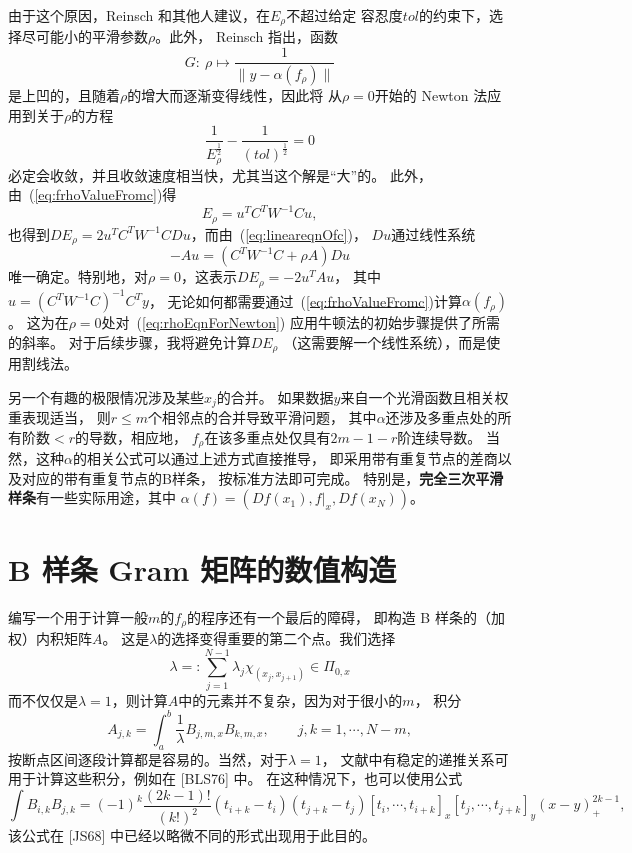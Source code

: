 由于这个原因，Reinsch 和其他人建议，在$E_{\rho}$不超过给定
容忍度$tol$的约束下，选择尽可能小的平滑参数$\rho$。此外，
Reinsch 指出，函数
\begin{displaymath}
  G:\ \rho\mapsto \frac{1}{\|y-\alpha(f_{\rho})\|}
\end{displaymath}
是上凹的，且随着$\rho$的增大而逐渐变得线性，因此将
从$\rho=0$开始的 Newton 法应用到关于$\rho$的方程
\begin{equation}
  \label{eq:rhoEqnForNewton}
  \frac{1}{E_{\rho}^{\frac{1}{2}}}
  -\frac{1}{(tol)^{\frac{1}{2}}}=0
\end{equation}
必定会收敛，并且收敛速度相当快，尤其当这个解是“大”的。
此外，由~(\ref{eq:frhoValueFromc})得
\begin{displaymath}
  E_{\rho}=u^{T}C^{T}W^{-1}Cu,
\end{displaymath}
也得到$DE_{\rho}=2u^{T}C^{T}W^{-1}CDu$，而由~(\ref{eq:lineareqnOfc})，
$Du$通过线性系统
\begin{displaymath}
  -Au=(C^{T}W^{-1}C+\rho A)Du
\end{displaymath}
唯一确定。特别地，对$\rho=0$，这表示$DE_{\rho}=-2u^{T}Au$，
其中$u=(C^{T}W^{-1}C)^{-1}C^{T}y$，
无论如何都需要通过~(\ref{eq:frhoValueFromc})计算$\alpha(f_{\rho})$。
这为在$\rho=0$处对~(\ref{eq:rhoEqnForNewton})
应用牛顿法的初始步骤提供了所需的斜率。
对于后续步骤，我将避免计算$DE_{\rho}$
（这需要解一个线性系统），而是使用割线法。

另一个有趣的极限情况涉及某些$x_{j}$的合并。
如果数据$y$来自一个光滑函数且相关权重表现适当，
则$r\le m$个相邻点的合并导致平滑问题，
其中$\alpha$还涉及多重点处的所有阶数$<r$的导数，相应地，
$f_{\rho}$在该多重点处仅具有$2m-1-r$阶连续导数。
当然，这种$\alpha$的相关公式可以通过上述方式直接推导，
即采用带有重复节点的差商以及对应的带有重复节点的B样条，
按标准方法即可完成。
特别是，\textbf{完全三次平滑样条}有一些实际用途，其中
$\alpha(f)=(Df(x_{1}),f|_{x},Df(x_{N}))$。


\section{ B 样条 Gram 矩阵的数值构造}
编写一个用于计算一般$m$的$f_{\rho}$的程序还有一个最后的障碍，
即构造 B 样条的（加权）内积矩阵$A$。
这是$\lambda$的选择变得重要的第二个点。我们选择
\begin{displaymath}
  \lambda=:\sum_{j=1}^{N-1}\lambda_{j}\chi_{(x_{j},x_{j+1})}
  \in\Pi_{0,x}
\end{displaymath}
而不仅仅是$\lambda=1$，则计算$A$中的元素并不复杂，因为对于很小的$m$，
积分
\begin{displaymath}
  A_{j,k}=\int_{a}^{b}\frac{1}{\lambda} B_{j,m,x}B_{k,m,x},
  \qquad j,k=1,\cdots,N-m,
\end{displaymath}
按断点区间逐段计算都是容易的。当然，对于$\lambda=1$，
文献中有稳定的递推关系可用于计算这些积分，例如在 [BLS76] 中。
在这种情况下，也可以使用公式
\begin{displaymath}
  \int B_{i,k}B_{j,k}=(-1)^{k}\frac{(2k-1)!}{(k!)^{2}}
  (t_{i+k}-t_{i})(t_{j+k}-t_{j})
  [t_{i},\cdots,t_{i+k}]_{x}[t_{j},\cdots,t_{j+k}]_{y}
  (x-y)_{+}^{2k-1},
\end{displaymath}
该公式在 [JS68] 中已经以略微不同的形式出现用于此目的。

